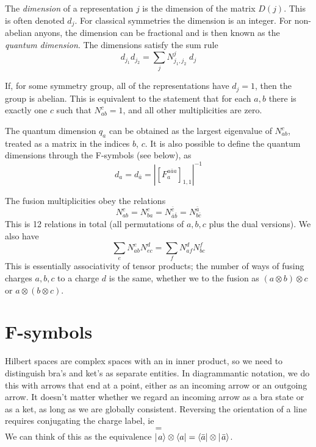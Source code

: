 \documentclass[12pt]{article}
\begin{document}
The \emph{dimension} of a representation $j$ is the dimension of the matrix $D(j)$. This
is often denoted $d_j$. For classical symmetries the dimension is an integer. For non-abelian
anyons, the dimension can be fractional and is then known as the \emph{quantum dimension}.
The dimensions satisfy the sum rule
\begin{equation}
d_{j_1} d_{j_2} = \sum_j N^{j}_{j_1,j_2} \; d_j
\end{equation}

If, for some symmetry group, all of the representations have $d_j = 1$, then the
group is abelian. This is equivalent to the statement that for each $a,b$ there is exactly
one $c$ such that $N^{c}_{ab} = 1$, and all other multiplicities are zero.

The quantum dimension $q_a$ can be obtained as the largest eigenvalue of $N^c_{ab}$, treated
as a matrix in the indices $b$, $c$. It is also possible to define the quantum dimensions through
the F-symbols (see below), as
\begin{equation}
d_a = d_{\bar{a}} = \left| [F^{a\bar{a}a}_a]_{1,1} \right|^{-1}
\end{equation}

The fusion multiplicities obey the relations
\begin{equation}
N^{c}_{ab} = N^{c}_{ba} = N^{\bar{c}}_{\bar{a}\bar{b}} = N^{\bar{a}}_{b \bar{c}}
\end{equation}
This is 12 relations in total (all permutations of $a,b,c$ plus the dual versions).
We also have
\begin{equation}
\sum_e N^{e}_{ab} N^d_{ec} = \sum_f N^d_{af} N^f_{bc}
\end{equation}
This is essentially associativity of tensor products; the number of ways of fusing
charges $a,b,c$ to a charge $d$ is the same, whether we to the fusion as
$(a\otimes b) \otimes c$ or $a \otimes (b \otimes c)$.


\section{F-symbols}

Hilbert spaces are complex spaces with an in inner product, so we need to distinguish
bra's and ket's as separate entities. In diagrammantic notation, we do this with
arrows that end at a point, either as an incoming arrow or an outgoing arrow.
It doesn't matter whether we regard an incoming arrow as a bra state
or as a ket, as long as we are globally consistent. Reversing the orientation of a line
requires conjugating the charge label, ie
\begin{equation}
\begin{gathered}

\end{gathered}
=
\begin{gathered}

\end{gathered}
\end{equation}
We can think of this as the equivalence $\hbox{$\mid \! {a} \rangle$} \otimes \langle a | = \langle \bar{a} | \otimes \hbox{$\mid \! {\bar{a}} \rangle$}$.
\end{document}
